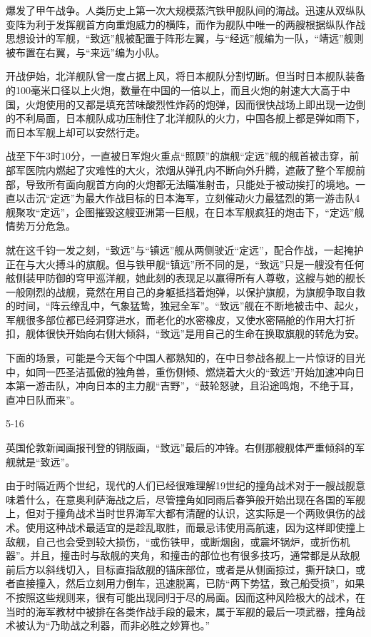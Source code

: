 \documentclass[12pt,UTF8]{ctexbook}
\begin{document}
爆发了甲午战争。人类历史上第一次大规模蒸汽铁甲舰队间的海战。迅速从双纵队变阵为利于发挥舰首方向重炮威力的横阵，而作为舰队中唯一的两艘根据纵队作战思想设计的军舰，“致远”舰被配置于阵形左翼，与“经远”舰编为一队，“靖远”舰则被布置在右翼，与“来远”编为小队。

开战伊始，北洋舰队曾一度占据上风，将日本舰队分割切断。但当时日本舰队装备的100毫米口径以上火炮，数量在中国的一倍以上，而且火炮的射速大大高于中国，火炮使用的又都是填充苦味酸烈性炸药的炮弹，因而很快战场上即出现一边倒的不利局面，日本舰队成功压制住了北洋舰队的火力，中国各舰上都是弹如雨下，而日本军舰上却可以安然行走。

战至下午3时10分，一直被日军炮火重点“照顾”的旗舰“定远”舰的舰首被击穿，前部军医院内燃起了灾难性的大火，浓烟从弹孔内不断向外升腾，遮蔽了整个军舰前部，导致所有面向舰首方向的火炮都无法瞄准射击，只能处于被动挨打的境地。一直以击沉“定远”为最大作战目标的日本海军，立刻催动火力最猛烈的第一游击队4舰聚攻“定远”，企图摧毁这艘亚洲第一巨舰，在日本军舰疯狂的炮击下，“定远”舰情势万分危急。

就在这千钧一发之刻，“致远”与“镇远”舰从两侧驶近“定远”，配合作战，一起掩护正在与大火搏斗的旗舰。但与铁甲舰“镇远”所不同的是，“致远”只是一艘没有任何舷侧装甲防御的穹甲巡洋舰，她此刻的表现足以赢得所有人尊敬，这艘与她的舰长一般刚烈的战舰，竟然在用自己的身躯抵挡着炮弹，以保护旗舰，为旗舰争取自救的时间，“阵云缭乱中，气象猛鸷，独冠全军”。“致远”舰在不断地被击中、起火，军舰很多部位都已经洞穿进水，而老化的水密橡皮，又使水密隔舱的作用大打折扣，舰体很快开始向右侧大倾斜，“致远”是用自己的生命在换取旗舰的转危为安。

下面的场景，可能是今天每个中国人都熟知的，在中日参战各舰上一片惊讶的目光中，如同一匹圣洁孤傲的独角兽，重伤侧倾、燃烧着大火的“致远”开始加速冲向日本第一游击队，冲向日本的主力舰“吉野”，“鼓轮怒驶，且沿途鸣炮，不绝于耳，直冲日队而来”。

5-16

英国伦敦新闻画报刊登的铜版画，“致远”最后的冲锋。右侧那艘舰体严重倾斜的军舰就是“致远”。

由于时隔近两个世纪，现代的人们已经很难理解19世纪的撞角战术对于一艘战舰意味着什么，在意奥利萨海战之后，尽管撞角如同雨后春笋般开始出现在各国的军舰上，但对于撞角战术当时世界海军大都有清醒的认识，这实际是一个两败俱伤的战术。使用这种战术最适宜的是趁乱取胜，而最忌讳使用高航速，因为这样即使撞上敌舰，自己也会受到较大损伤，“或伤铁甲，或断烟囱，或震坏锅炉，或折伤机器”。并且，撞击时与敌舰的夹角，和撞击的部位也有很多技巧，通常都是从敌舰前后方以斜线切入，目标直指敌舰的锚床部位，或者是从侧面掠过，撕开缺口，或者直接撞入，然后立刻用力倒车，迅速脱离，已防“两下势猛，致己船受损”，如果不按照这些规则来，很有可能出现同归于尽的局面。因而这种风险极大的战术，在当时的海军教材中被排在各类作战手段的最末，属于军舰的最后一项武器，撞角战术被认为“乃助战之利器，而非必胜之妙算也。”
\end{document}

